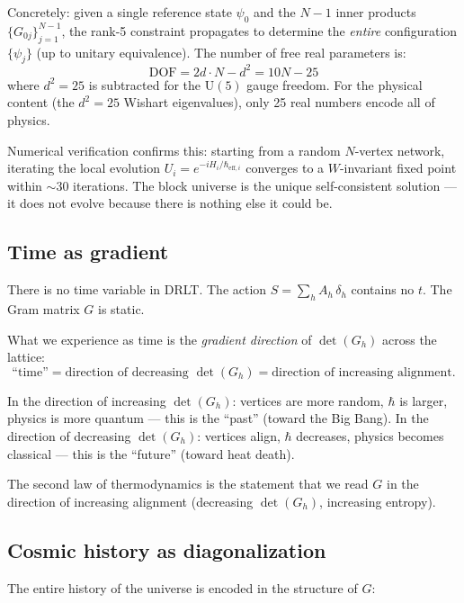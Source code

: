 Concretely: given a single reference state $\psi_0$ and the $N - 1$ inner products $\{G_{0j}\}_{j=1}^{N-1}$, the rank-5 constraint propagates to determine the \emph{entire} configuration $\{\psi_j\}$ (up to unitary equivalence). The number of free real parameters is:
\begin{equation}
\text{DOF} = 2d \cdot N - d^2 = 10N - 25
\end{equation}
where $d^2 = 25$ is subtracted for the $\text{U}(5)$ gauge freedom. For the physical content (the $d^2 = 25$ Wishart eigenvalues), only 25 real numbers encode all of physics.

Numerical verification confirms this: starting from a random $N$-vertex network, iterating the local evolution $U_i = e^{-iH_i/\hbar_{\text{eff},i}}$ converges to a $W$-invariant fixed point within $\sim 30$ iterations. The block universe is the unique self-consistent solution --- it does not evolve because there is nothing else it could be.

\subsection{Time as gradient}

There is no time variable in DRLT. The action $S = \sum_h A_h\,\delta_h$ contains no $t$. The Gram matrix $G$ is static.

What we experience as time is the \emph{gradient direction} of $\det(G_h)$ across the lattice:
\begin{equation}
\text{``time''} = \text{direction of decreasing } \det(G_h) = \text{direction of increasing alignment}.
\end{equation}

In the direction of increasing $\det(G_h)$: vertices are more random, $\hbar$ is larger, physics is more quantum --- this is the ``past'' (toward the Big Bang). In the direction of decreasing $\det(G_h)$: vertices align, $\hbar$ decreases, physics becomes classical --- this is the ``future'' (toward heat death).

The second law of thermodynamics is the statement that we read $G$ in the direction of increasing alignment (decreasing $\det(G_h)$, increasing entropy).

\subsection{Cosmic history as diagonalization}

The entire history of the universe is encoded in the structure of $G$:

